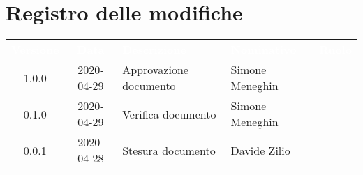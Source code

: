 \section*{Registro delle modifiche}
{
	\centering
	\begin{longtable}{ c c C{4cm}  C{4cm}  C{3cm} }
		\textcolor{white}{\textbf{Versione}} & \textcolor{white}{\textbf{Data}} & \textcolor{white}{\textbf{Descrizione}} & \textcolor{white}{\textbf{Nominativo}} & \textcolor{white}{\textbf{Ruolo}}\\		
		1.0.0 & 2020-04-29 & Approvazione documento & Simone Meneghin &\RdP{}\\		
		0.1.0 & 2020-04-29 & Verifica documento & Simone Meneghin &\ver{}\\		
		0.0.1 & 2020-04-28 & Stesura documento & Davide Zilio &\reda{}\\		
		
	\end{longtable}

}